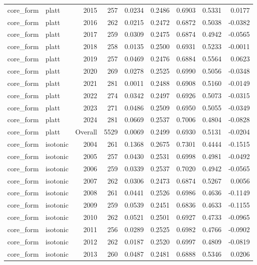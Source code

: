 \begin{table}[t]
\begin{tabular}{@{} l l r r r r r r r @{} }
      core\_form & platt & 2015 & 257 & 0.0234 & 0.2486 & 0.6903 & 0.5331 & 0.0177 \\
      core\_form & platt & 2016 & 262 & 0.0215 & 0.2472 & 0.6872 & 0.5038 & -0.0382 \\
      core\_form & platt & 2017 & 259 & 0.0309 & 0.2475 & 0.6874 & 0.4942 & -0.0565 \\
      core\_form & platt & 2018 & 258 & 0.0135 & 0.2500 & 0.6931 & 0.5233 & -0.0011 \\
      core\_form & platt & 2019 & 257 & 0.0469 & 0.2476 & 0.6884 & 0.5564 & 0.0623 \\
      core\_form & platt & 2020 & 269 & 0.0278 & 0.2525 & 0.6990 & 0.5056 & -0.0348 \\
      core\_form & platt & 2021 & 281 & 0.0011 & 0.2488 & 0.6908 & 0.5160 & -0.0149 \\
      core\_form & platt & 2022 & 274 & 0.0342 & 0.2497 & 0.6926 & 0.5073 & -0.0315 \\
      core\_form & platt & 2023 & 271 & 0.0486 & 0.2509 & 0.6950 & 0.5055 & -0.0349 \\
      core\_form & platt & 2024 & 281 & 0.0669 & 0.2537 & 0.7006 & 0.4804 & -0.0828 \\
      core\_form & platt & Overall & 5529 & 0.0069 & 0.2499 & 0.6930 & 0.5131 & -0.0204 \\
      core\_form & isotonic & 2004 & 261 & 0.1368 & 0.2675 & 0.7301 & 0.4444 & -0.1515 \\
      core\_form & isotonic & 2005 & 257 & 0.0430 & 0.2531 & 0.6998 & 0.4981 & -0.0492 \\
      core\_form & isotonic & 2006 & 259 & 0.0339 & 0.2537 & 0.7020 & 0.4942 & -0.0565 \\
      core\_form & isotonic & 2007 & 262 & 0.0306 & 0.2473 & 0.6874 & 0.5267 & 0.0056 \\
      core\_form & isotonic & 2008 & 261 & 0.0441 & 0.2526 & 0.6986 & 0.4636 & -0.1149 \\
      core\_form & isotonic & 2009 & 259 & 0.0539 & 0.2451 & 0.6836 & 0.4633 & -0.1155 \\
      core\_form & isotonic & 2010 & 262 & 0.0521 & 0.2501 & 0.6927 & 0.4733 & -0.0965 \\
      core\_form & isotonic & 2011 & 256 & 0.0289 & 0.2525 & 0.6982 & 0.4766 & -0.0902 \\
      core\_form & isotonic & 2012 & 262 & 0.0187 & 0.2520 & 0.6997 & 0.4809 & -0.0819 \\
      core\_form & isotonic & 2013 & 260 & 0.0487 & 0.2481 & 0.6888 & 0.5346 & 0.0206 \\

\end{tabular}
\end{table}
